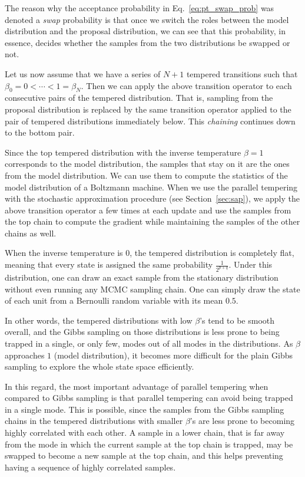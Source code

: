 \documentclass[dissertation,nocontribution]{aaltoseries}
\begin{document}
The reason why the acceptance probability in
Eq.~\eqref{eq:pt_swap_prob} was denoted a \textit{swap}
probability is that once we switch the roles between the
model distribution and the proposal distribution, we can see
that this probability, in essence, decides whether the
samples from the two distributions be swapped or not.

Let us now assume that we have a series of $N+1$ tempered
transitions such that $\beta_0=0 < \cdots < 1 = \beta_N$.
Then we can apply the above transition operator to each
consecutive pairs of the tempered distribution. That is, 
sampling from the proposal distribution is replaced by the
same transition operator applied to the pair of tempered
distributions immediately below. This \textit{chaining}
continues down to the bottom pair.

Since the top tempered distribution with the inverse
temperature $\beta=1$ corresponds to the model distribution,
the samples that stay on it are the ones from the model
distribution. We can use them to compute the statistics of
the model distribution of a Boltzmann machine. When we use
the parallel tempering with the stochastic approximation
procedure (see Section~\ref{sec:sap}), we apply the above
transition operator a few times at each update and use the
samples from the top chain to compute the gradient while
maintaining the samples of the other chains as well.

When the inverse temperature is $0$, the tempered
distribution is completely flat, meaning that every state is
assigned the same probability $\frac{1}{2^{p+q}}$. Under
this distribution, one can draw an exact sample from the
stationary distribution without even running any MCMC
sampling chain. One can simply draw the state of each unit
from a Bernoulli random variable with its mean $0.5$. 

In other words, the tempered distributions with low
$\beta$'s tend to be smooth overall, and the Gibbs sampling
on those distributions is less prone to being trapped in a
single, or only few, modes out of all modes in the
distributions. As $\beta$ approaches $1$ (model
distribution), it becomes more difficult for the plain Gibbs
sampling to explore the whole state space efficiently.

In this regard, the most important advantage of parallel
tempering when compared to Gibbs sampling is that 
parallel tempering can avoid being trapped in a single mode.
This is possible, since the samples from the Gibbs sampling
chains in the tempered distributions with smaller $\beta$'s
are less prone to becoming highly correlated with each other.
A sample in a lower chain, that is far away from the mode
in which the current sample at the top chain is trapped, may be
swapped to become a new sample at the top chain, and this
helps preventing having a sequence of highly correlated
samples. 
\end{document}
